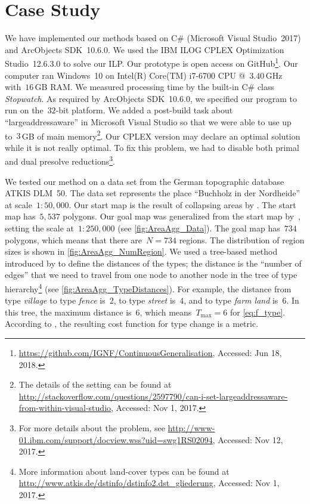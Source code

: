 \documentclass[acmsmall,natbib=false]{acmart}
\begin{document}
\section{Case Study}
\label{sec:AreaAgg_CaseStudy}
We have implemented our methods 
based on C\# (Microsoft Visual Studio~2017) 
and ArcObjects SDK~10.6.0.
We used the IBM ILOG
CPLEX Optimization Studio~12.6.3.0 to solve our ILP.
Our prototype is open access on 
GitHub\footnote{
	\url{https://github.com/IGNF/ContinuousGeneralisation},
	Accessed: Jun 18, 2018.}.
Our computer ran
Windows~10 on Intel(R) Core(TM) i7-6700 CPU @~$3.40\,$GHz with~$16\,$GB RAM.
We measured processing time 
by the built-in C\# class \emph{Stopwatch}.
As required by ArcObjects SDK~10.6.0,
we specified our program to run on the~$32$-bit platform. 
We added a post-build task about ``largeaddressaware''
in Microsoft Visual Studio so that 
we were able to use up to~$3\,$GB of main memory\footnote{
	The details of the setting can be found at 	
	\url{http://stackoverflow.com/questions/2597790/can-i-set-largeaddressaware-from-within-visual-studio},
	Accessed: Nov 1, 2017.}.
Our CPLEX version may declare an optimal solution
while it is not really optimal.
To fix this problem, we had to disable 
both primal and dual presolve reductions\footnote{
	For more details about the problem, see
	\url{http://www-01.ibm.com/support/docview.wss?uid=swg1RS02094},
	Accessed: Nov 12, 2017.}.

We tested our method on a data set 
from the German topographic database ATKIS DLM~50. 
The data set represents the place 
``Buchholz in der Nordheide'' at scale~$1:50{,}000$. 
Our start map is the result of collapsing areas 
by \citet[\chap~6]{haunert2008f}.
The start map has~$5{,}537$ polygons. 
Our goal map was generalized from the start map 
by~\citet{HaunertWolff2010AreaAgg}, setting the scale 
at~$1:250{,}000$ (see \fig\ref{fig:AreaAgg_Data}). 
The goal map has~$734$ polygons, 
which means that there are~$N=734$ regions.
The distribution of region sizes is shown in \fig\ref{fig:AreaAgg_NumRegion}.
%
We used a tree-based method introduced by 
\citet{Rada1989SemanticMetric} 
to define the distances of the types;
the distance is the ``number of edges'' that
we need to travel from one node to another 
node in the tree of type hierarchy\footnote{
	More information about land-cover types can be found at 
	\url{http://www.atkis.de/dstinfo/dstinfo2.dst_gliederung},
	Accessed: Nov 1, 2017.}
(see \fig\ref{fig:AreaAgg_TypeDistances}). 
For example, the distance from type \emph{village}
to type \emph{fence} is~$2$, 
to type \emph{street} is~$4$, and
to type \emph{farm land} is~$6$.
In this tree, the maximum distance is~$6$, 
which means~$T_\mathrm{max}=6$ for \eq\ref{eq:f_type}.
According to \citet{Rada1989SemanticMetric}, 
the resulting cost function for type change is a metric.
\end{document}
